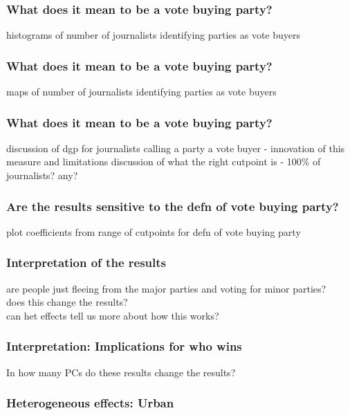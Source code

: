 \documentclass{beamer}
\begin{document}
\begin{frame}
\frametitle{What does it mean to be a vote buying party?}

histograms of number of journalists identifying parties as vote buyers

\end{frame}


\begin{frame}
\frametitle{What does it mean to be a vote buying party?}

maps of number of journalists identifying parties as vote buyers

\end{frame}


\begin{frame}
\frametitle{What does it mean to be a vote buying party?}

discussion of dgp for journalists calling a party a vote buyer - innovation of this measure and limitations
discussion of what the right cutpoint is - 100\% of journalists? any?  
 
\end{frame}


\begin{frame}
\frametitle{Are the results sensitive to the defn of vote buying party?}

plot coefficients from range of cutpoints for defn of vote buying party 

\end{frame}


\begin{frame}
\frametitle{Interpretation of the results}

are people just fleeing from the major parties and voting for minor parties?\\
does this change the results? \\
can het effects tell us more about how this works?

\end{frame}


\begin{frame}
\frametitle{Interpretation: Implications for who wins}

In how many PCs do these results change the results?

\end{frame}


\begin{frame}
\frametitle{Heterogeneous effects: Urban}


\end{frame}
\end{document}

